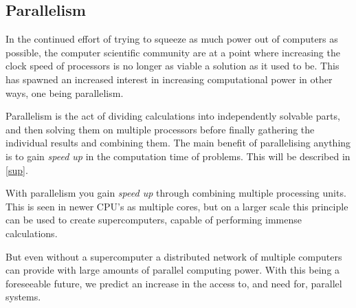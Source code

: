

\subsection{Parallelism}

In the continued effort of trying to squeeze as much power out of computers as possible, the computer scientific community are at a point where increasing the clock speed of processors is no longer as viable a solution as it used to be. This has spawned an increased interest in increasing computational power in other ways, one being parallelism.

Parallelism is the act of dividing calculations into independently solvable parts, and then solving them on multiple processors before finally gathering the individual results and combining them. The main benefit of parallelising anything is to gain \emph{speed up} in the computation time of problems. This will be described in \cref{sup}.

With parallelism you gain \emph{speed up} through combining multiple processing units. This is seen in newer CPU's as multiple cores, but on a larger scale this principle can be used to create supercomputers, capable of performing immense calculations.

But even without a supercomputer a distributed network of multiple computers can provide with large amounts of parallel computing power. With this being a foreseeable future, we predict an increase in the access to, and need for, parallel systems.
